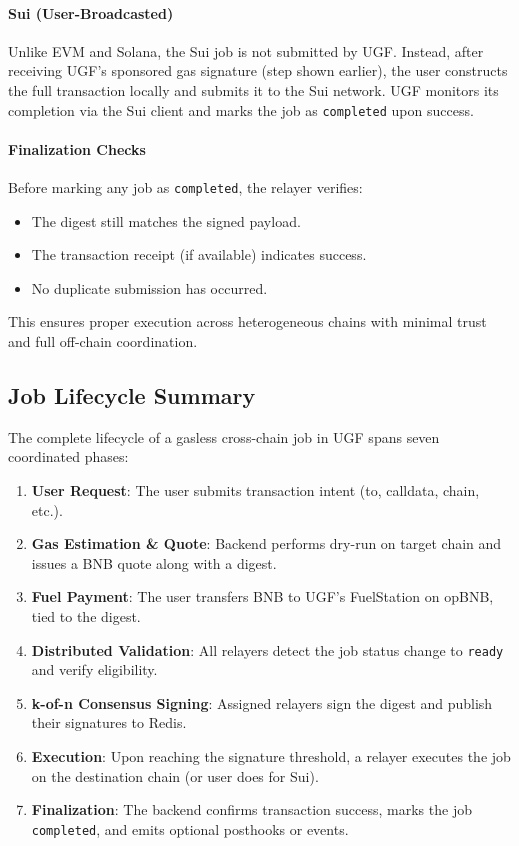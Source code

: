\documentclass{article}
\begin{document}
\paragraph{Sui (User-Broadcasted)}
Unlike EVM and Solana, the Sui job is not submitted by UGF. Instead, after receiving UGF’s sponsored gas signature (step shown earlier), the user constructs the full transaction locally and submits it to the Sui network. UGF monitors its completion via the Sui client and marks the job as \texttt{completed} upon success.

\paragraph{Finalization Checks}
Before marking any job as \texttt{completed}, the relayer verifies:
\begin{itemize}
  \item The digest still matches the signed payload.
  \item The transaction receipt (if available) indicates success.
  \item No duplicate submission has occurred.
\end{itemize}

This ensures proper execution across heterogeneous chains with minimal trust and full off-chain coordination.

\subsection{Job Lifecycle Summary}

The complete lifecycle of a gasless cross-chain job in UGF spans seven coordinated phases:

\begin{enumerate}
  \item \textbf{User Request}: The user submits transaction intent (to, calldata, chain, etc.).
  \item \textbf{Gas Estimation \& Quote}: Backend performs dry-run on target chain and issues a BNB quote along with a digest.
  \item \textbf{Fuel Payment}: The user transfers BNB to UGF’s FuelStation on opBNB, tied to the digest.
  \item \textbf{Distributed Validation}: All relayers detect the job status change to \texttt{ready} and verify eligibility.
  \item \textbf{k-of-n Consensus Signing}: Assigned relayers sign the digest and publish their signatures to Redis.
  \item \textbf{Execution}: Upon reaching the signature threshold, a relayer executes the job on the destination chain (or user does for Sui).
  \item \textbf{Finalization}: The backend confirms transaction success, marks the job \texttt{completed}, and emits optional posthooks or events.
\end{enumerate}
\end{document}
